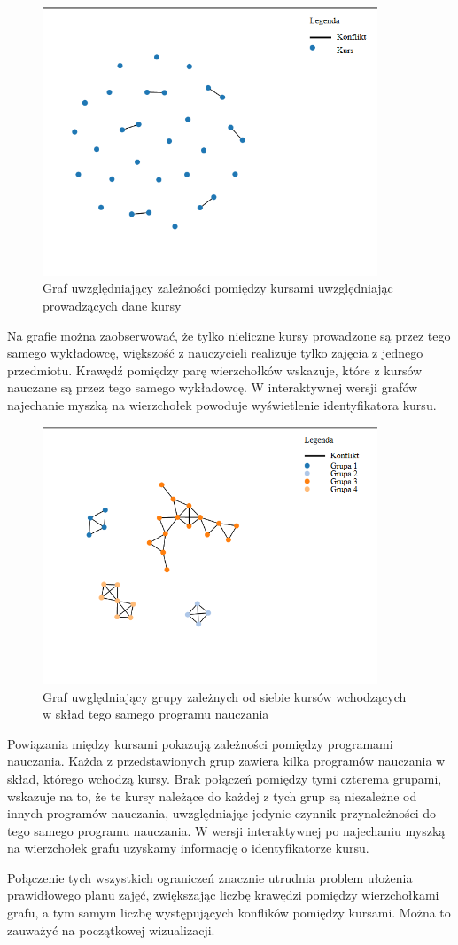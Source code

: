 \begin{figure}[H]
  \caption{Graf uwzględniający zależności pomiędzy kursami uwzględniając prowadzących dane kursy}
  \centering
    \includegraphics[width=10cm]{test1_teach.PNG}
\end{figure}
Na grafie można zaobserwować, że tylko nieliczne kursy prowadzone są przez tego samego wykładowcę, większość z nauczycieli realizuje tylko zajęcia z jednego przedmiotu. Krawędź pomiędzy parę wierzchołków wskazuje, które z kursów nauczane są przez tego samego wykładowcę. W interaktywnej wersji grafów najechanie myszką na wierzchołek powoduje wyświetlenie identyfikatora kursu.
\begin{figure}[H]
  \caption{Graf uwględniający grupy zależnych od siebie kursów wchodzących w skład tego samego programu nauczania}
  \centering
    \includegraphics[width=10cm]{test1_con.PNG}
\end{figure}
\par Powiązania między kursami pokazują zależności pomiędzy programami nauczania. Każda z przedstawionych grup zawiera kilka programów nauczania w skład, którego wchodzą kursy. Brak połączeń pomiędzy tymi czterema grupami, wskazuje na to, że te kursy należące do każdej z tych grup są niezależne od innych programów nauczania, uwzględniając jedynie czynnik przynależności do tego samego programu nauczania. W wersji interaktywnej po najechaniu myszką na wierzchołek grafu uzyskamy informację o identyfikatorze kursu.
\par Połączenie tych wszystkich ograniczeń znacznie utrudnia problem ułożenia prawidłowego planu zajęć, zwiększając liczbę krawędzi pomiędzy wierzchołkami grafu, a tym samym liczbę występujących konflików pomiędzy kursami. Można to zauważyć na początkowej wizualizacji.


